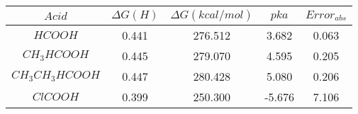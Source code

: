 \begin{tabular}{|c|c|c|c|c|}
    \hline
    $Acid$          & $\Delta G (H)$ & $\Delta G (kcal/mol)$ & $pka$  & $Error_{abs}$ \\ \hline
    $HCOOH$         & 0.441          & 276.512               & 3.682  & 0.063          \\ \hline
    $CH_3HCOOH$     & 0.445          & 279.070               & 4.595  & 0.205           \\ \hline
    $CH_3CH_3HCOOH$ & 0.447          & 280.428               & 5.080  & 0.206            \\ \hline
    $ClCOOH$        & 0.399          & 250.300               & -5.676 & 7.106             \\ \hline
\end{tabular}